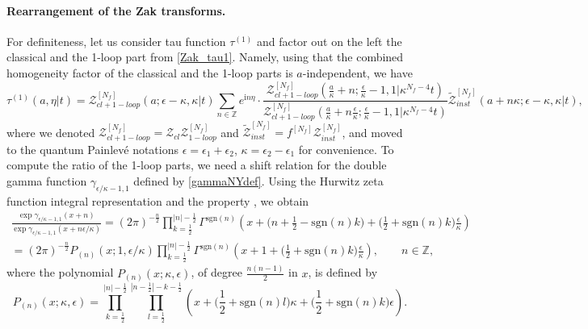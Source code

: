 \documentclass[12pt,a4paper]{article}
\numberwithin{equation}{section}
\newcommand{\ri}{\mathrm{i}}
\begin{document}
\paragraph{Rearrangement of the Zak transforms.}
For definiteness, let us consider tau function $\tau^{(1)}$ and factor out on the left the classical and the 1-loop part from \eqref{Zak_tau1}. Namely, using that the combined homogeneity factor of the classical \cite[(2.7)]{BST25} and the 1-loop \cite[(2.8)]{BST25} parts is $a$-independent, we have
\begin{equation}\label{rearr}
\tau^{(1)}(a,\eta|t)=\mathcal{Z}^{[N_f]}_{cl+1-loop}(a;\epsilon{-}\kappa,\kappa|t) \sum_{n\in\mathbb{Z}}e^{\ri n \eta}\cdot\frac{\mathcal{Z}^{[N_f]}_{cl+1-loop}\left(\frac{a}{\kappa}{+}n;\frac{\epsilon}{\kappa}{-}1,1\Big|\kappa^{N_f{-}4}t\right)}{\mathcal{Z}^{[N_f]}_{cl+1-loop}\left(\frac{a}{\kappa}{+}n\frac{\epsilon}{\kappa};\frac{\epsilon}{\kappa}{-}1,1\Big|\kappa^{N_f{-}4} t\right)}\widetilde{\mathcal{Z}}^{[N_f]}_{inst}(a{+}n\kappa;\epsilon{-}\kappa,\kappa|t),
\end{equation}
where we denoted $\mathcal{Z}_{cl+1-loop}^{[N_f]}=\mathcal{Z}_{cl}\mathcal{Z}_{1-loop}^{[N_f]}$ and $\widetilde{\mathcal{Z}}_{inst}^{[N_f]}=f^{[N_f]}\mathcal{Z}_{inst}^{[N_f]}$,
and moved to the quantum Painlev\'e notations $\epsilon=\epsilon_1{+}\epsilon_2$, $\kappa=\epsilon_2{-}\epsilon_1$ for convenience.
To compute the ratio of the 1-loop parts, we need a shift relation for the double gamma function $\gamma_{\epsilon/\kappa{-}1,1}$ defined by \eqref{gammaNYdef}. Using the Hurwitz zeta function integral representation \cite[\href{https://dlmf.nist.gov/25.11.E25}{(25.11.25)}]{DLMF} and the property \cite[\href{https://dlmf.nist.gov/25.11.E18}{(25.11.18)}]{DLMF}, we obtain
\begin{multline}
\frac{\exp\gamma_{\epsilon/\kappa{-}1,1}(x{+}n)}{\exp\gamma_{\epsilon/\kappa{-}1,1}(x{+}n\epsilon/\kappa)}=(2\pi)^{-\frac{n}2}\prod_{k=\frac12}^{|n|-\frac12}\Gamma^{\mathrm{sgn}(n)}\left(x+\Big(n{+}\frac12{-}\mathrm{sgn}(n)k\Big)+\Big(\frac12{+}\mathrm{sgn}(n)k\Big)\frac{\epsilon}{\kappa}\right)\\
=(2\pi)^{-\frac{n}2}P_{(n)}(x;1,\epsilon/\kappa)\prod_{k=\frac12}^{|n|-\frac12}\Gamma^{\mathrm{sgn}(n)}\left(x+1+\Big(\frac12{+}\mathrm{sgn}(n)k\Big)\frac{\epsilon}{\kappa}\right), \qquad n\in\mathbb{Z},
\end{multline}
where the polynomial $P_{(n)}(x;\kappa,\epsilon)$, of degree $\frac{n(n{-}1)}2$ in $x$, is defined by
\begin{equation}\label{Pn}
P_{(n)}(x;\kappa,\epsilon)=\prod_{k=\frac12}^{|n|-\frac12}\prod_{l=\frac12}^{|n-\frac12|-k-\frac12} \left(x+\Big(\frac12{+}\mathrm{sgn}(n)l\Big)\kappa+\Big(\frac12{+}\mathrm{sgn}(n)k\Big)\epsilon\right).   
\end{equation}
\end{document}
